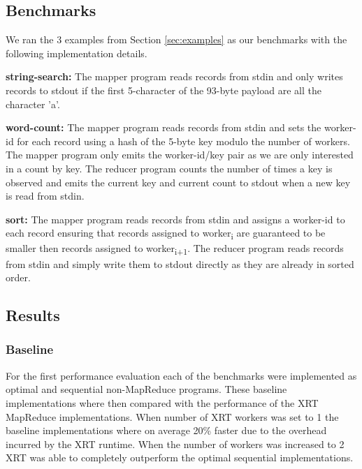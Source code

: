 \documentclass[twocolumn,11px]{article}       %
\begin{document}
\subsection{Benchmarks}

We ran the 3 examples from Section \ref{sec:examples} as our benchmarks with the following implementation details.

\bigskip
\noindent
\textbf{string-search:} The mapper program reads records from stdin and only writes records to stdout if the first 5-character of the 93-byte payload are all the character 'a'.

\bigskip
\noindent
\textbf{word-count:} The mapper program reads records from stdin and sets the worker-id for each record using a hash of the 5-byte key modulo the number of workers.
The mapper program only emits the worker-id/key pair as we are only interested in a count by key.
The reducer program counts the number of times a key is observed and emits the current key and current count to stdout when a new key is read from stdin.

\bigskip
\noindent
\textbf{sort:} The mapper program reads records from stdin and assigns a worker-id to each record ensuring that records assigned to worker\textsubscript{i} are guaranteed to be smaller then records assigned to worker\textsubscript{i+1}.
The reducer program reads records from stdin and simply write them to stdout directly as they are already in sorted order.

\subsection{Results}

\subsubsection{Baseline}

For the first performance evaluation each of the benchmarks were implemented as optimal and sequential non-MapReduce programs.
These baseline implementations where then compared with the performance of the XRT MapReduce implementations.
When number of XRT workers was set to 1 the baseline implementations where on average 20\% faster due to the overhead incurred by the XRT runtime.
When the number of workers was increased to 2 XRT was able to completely outperform the optimal sequential implementations.
\end{document}

